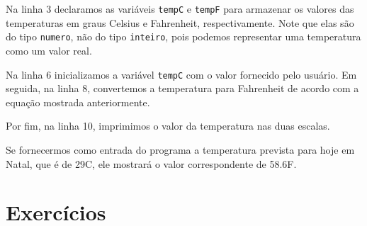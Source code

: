 \documentclass{report}
\begin{document}
Na linha 3 declaramos as variáveis \texttt{tempC} e \texttt{tempF} para armazenar
os valores das temperaturas em graus Celsius e Fahrenheit, respectivamente. Note
que elas são do tipo \texttt{numero}, não do tipo \texttt{inteiro}, pois podemos
representar uma temperatura como um valor real.

Na linha 6 inicializamos a variável \texttt{tempC} com o valor fornecido pelo usuário.
Em seguida, na linha 8, convertemos a temperatura para Fahrenheit de acordo com a
equação mostrada anteriormente.

Por fim, na linha 10, imprimimos o valor da temperatura nas duas escalas.

Se fornecermos como entrada do programa a temperatura prevista para hoje em Natal,
que é de 29\degree C, ele mostrará o valor correspondente de 58.6\degree F.


\section{Exercícios}
\end{document}
